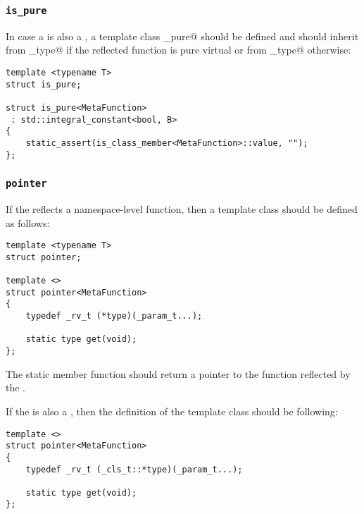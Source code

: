 \subsubsection{\texttt{is\_pure}}

In case a  is also a ,
a template class \verb@is_pure@ should be defined and should inherit from
\verb@true_type@ if the reflected function is pure virtual or from \verb@false_type@
otherwise:

\begin{verbatim}
template <typename T>
struct is_pure;

struct is_pure<MetaFunction>
 : std::integral_constant<bool, B>
{
	static_assert(is_class_member<MetaFunction>::value, "");
};
\end{verbatim}

\subsubsection{\texttt{pointer}}

If the  reflects a namespace-level function, then
a template class \verb@pointer@ should be defined as follows:

\begin{verbatim}
template <typename T>
struct pointer;

template <>
struct pointer<MetaFunction>
{
	typedef _rv_t (*type)(_param_t...);

	static type get(void);
};
\end{verbatim}

The \verb@get@ static member function should return a pointer to the function
reflected by the .

If the  is also a , then the definition of the
\verb@pointer@ template class should be following:

\begin{verbatim}
template <>
struct pointer<MetaFunction>
{
	typedef _rv_t (_cls_t::*type)(_param_t...);

	static type get(void);
};
\end{verbatim}

